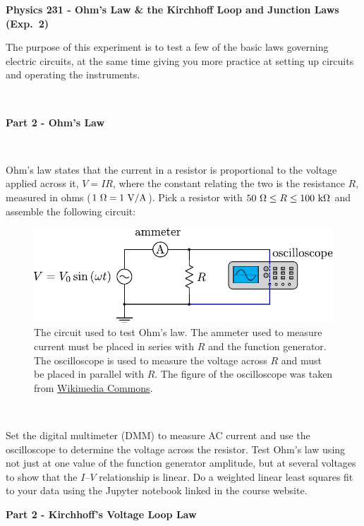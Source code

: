 \documentclass[12pt,oneside,openany,letterpaper]{article}
\begin{document}
\thispagestyle{plain}
\begin{center}
{\large{\bf{\selectfont Physics 231 - Ohm's Law \& the Kirchhoff Loop and Junction Laws  (Exp.~2)}}}
\end{center}

\noindent The purpose of this experiment is to test a few of the basic laws governing electric circuits, at the same time giving you more practice at setting up circuits and operating the instruments.

~


{\bf Part 2 - Ohm's Law}

~

\noindent Ohm’s law states that the current in a resistor is proportional to the voltage applied across it, $V = IR$, where the constant relating the two is the resistance $R$, measured in ohms ($1\rm\ \Omega = 1\rm\ V/A$). Pick a resistor with $50~\Omega\le R\le 100\rm\ k\Omega$ and assemble the following circuit:
\begin{figure}[h!]
\begin{center}
\includegraphics[width=.7\textwidth]{figures/Lab2Fig1.pdf}\caption{\label{fig:fig1}The circuit used to test Ohm's law.  The ammeter used to measure current must be placed in series with $R$ and the function generator.  The oscilloscope is used to measure the voltage across $R$ and must be placed in parallel with $R$.  The figure of the oscilloscope was taken from \href{https://commons.wikimedia.org/wiki/File:Symbol_oscilloscope.svg}{Wikimedia Commons}.}
\end{center}
\end{figure}

~

\noindent Set the digital multimeter (DMM) to measure AC current and use the oscilloscope to determine the voltage across the resistor. Test Ohm’s law using not just at one value of the function generator amplitude, but at several voltages to show that the $I$–$V$ relationship is linear. Do a weighted linear least squares fit to your data using the Jupyter notebook linked in the course website.


\clearpage


{\bf Part 2 - Kirchhoff's Voltage Loop Law}
\end{document}
